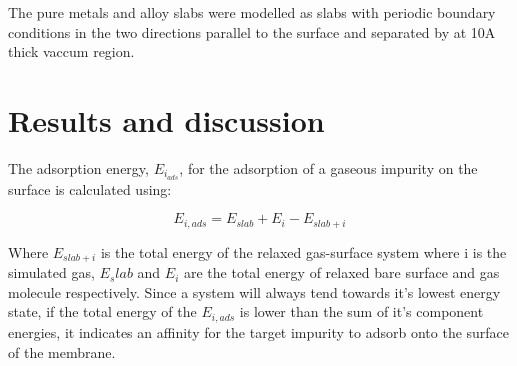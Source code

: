 The pure metals and alloy slabs were modelled as slabs with periodic boundary conditions in the two directions parallel to the surface and separated by at 10A thick vaccum region. 


\section{Results and discussion}
The adsorption energy, $E_{i_{ads}}$, for the adsorption of a gaseous impurity on the surface is calculated using:

\begin{equation}
    E_{i,ads} = E_{slab} + E_i - E_{slab + i}
\end{equation}

Where $E_{slab + i}$ is the total energy of the relaxed gas-surface system where i is the simulated gas, $E_slab$ and $E_i$ are the total energy of relaxed bare surface and gas molecule respectively. Since a system will always tend towards it's lowest energy state, if the total energy of the $E_{i,ads}$ is lower than the sum of it's component energies, it indicates an affinity for the target impurity to adsorb onto the surface of the membrane.

